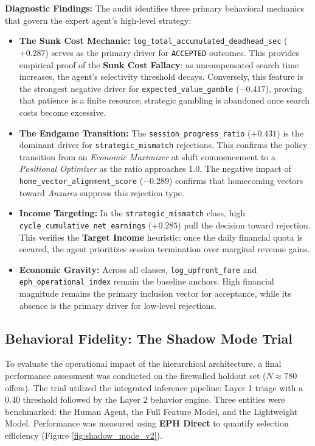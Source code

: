 \noindent \textbf{Diagnostic Findings:}
The audit identifies three primary behavioral mechanics that govern the expert agent's high-level strategy:

\begin{itemize}[noitemsep, topsep=3pt]
    \item \textbf{The Sunk Cost Mechanic:} \texttt{log\_total\_accumulated\_deadhead\_sec} ($+0.287$) serves as the primary driver for \texttt{ACCEPTED} outcomes. This provides empirical proof of the \textbf{Sunk Cost Fallacy}: as uncompensated search time increases, the agent's selectivity threshold decays. Conversely, this feature is the strongest negative driver for \texttt{expected\_value\_gamble} ($-0.417$), proving that patience is a finite resource; strategic gambling is abandoned once search costs become excessive.
    
    \item \textbf{The Endgame Transition:} The \texttt{session\_progress\_ratio} ($+0.431$) is the dominant driver for \texttt{strategic\_mismatch} rejections. This confirms the policy transition from an \textit{Economic Maximizer} at shift commencement to a \textit{Positional Optimizer} as the ratio approaches 1.0. The negative impact of \texttt{home\_vector\_alignment\_score} ($-0.289$) confirms that homecoming vectors toward \textit{Anzures} suppress this rejection type.
    
    \item \textbf{Income Targeting:} In the \texttt{strategic\_mismatch} class, high \texttt{cycle\_cumulative\_net\_earnings} ($+0.285$) pull the decision toward rejection. This verifies the \textbf{Target Income} heuristic: once the daily financial quota is secured, the agent prioritizes session termination over marginal revenue gains.
    
    \item \textbf{Economic Gravity:} Across all classes, \texttt{log\_upfront\_fare} and \texttt{eph\_operational\_index} remain the baseline anchors. High financial magnitude remains the primary inclusion vector for acceptance, while its absence is the primary driver for low-level rejections.
\end{itemize}



\subsection{Behavioral Fidelity: The Shadow Mode Trial}
To evaluate the operational impact of the hierarchical architecture, a final performance assessment was conducted on the firewalled holdout set ($N \approx 780$ offers). The trial utilized the integrated inference pipeline: Layer 1 triage with a 0.40 threshold followed by the Layer 2 behavior engine. Three entities were benchmarked: the Human Agent, the Full Feature Model, and the Lightweight Model. Performance was measured using \textbf{EPH Direct} to quantify selection efficiency (Figure \ref{fig:shadow_mode_v2}).

